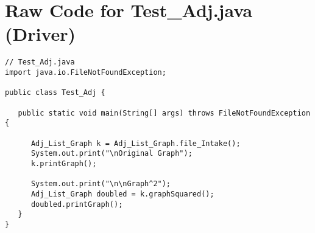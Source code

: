 \documentclass[11pt]{article}
\begin{document}
\section*{Raw Code for Test\_Adj.java (Driver)}

\lstset{
    basicstyle=\ttfamily\footnotesize,
    breaklines=true,
    frame=single,
    numbers=left,
    tabsize=4,
    showstringspaces=false,
    language=Java
}
\begin{lstlisting}
// Test_Adj.java
import java.io.FileNotFoundException;

public class Test_Adj {

   public static void main(String[] args) throws FileNotFoundException {

      Adj_List_Graph k = Adj_List_Graph.file_Intake();
      System.out.print("\nOriginal Graph");
      k.printGraph();

      System.out.print("\n\nGraph^2");
      Adj_List_Graph doubled = k.graphSquared();
      doubled.printGraph();
   }
}

\end{lstlisting}
\end{document}
